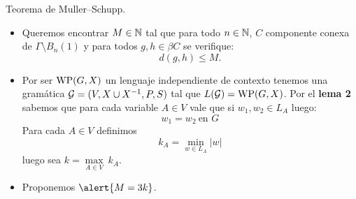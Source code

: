 \documentclass[aspectratio=169, 10pt]{beamer}
\begin{document}
	\begin{frame}[fragile]{Teorema de Muller--Schupp.}
		\begin{itemize}
			\item Queremos encontrar $M \in \mathbb{N}$ tal que para todo $n \in \mathbb{N}$, $C$ componente conexa de $\Gamma \setminus B_{n}(1)$
			y para todos $g,h \in \beta C$ se verifique:
			\[
				d(g,h) \le M.
			\]

			\item Por ser $\text{WP}(G, X)$ un lenguaje independiente de contexto tenemos una gramática ${\cal G} = (V,X \cup X^{-1}, P, S)$ tal que $L({\cal G}) = \text{WP}(G, X)$.
			Por el \textbf{lema 2} sabemos que para cada variable $A \in V$ vale que si $w_{1},w_{2} \in L_{A}$ luego:
			\[
				w_{1} = w_{2} \ \text{en } G
			\]
			Para cada $A \in V$ definimos 
			\[
				k_{A} = \underset{w \in L_{A}}{\min} |w|
			\]
			luego sea $k = \underset{A \in V}{\max} \ k_{A}$.

			\item Proponemos $\alert{M = 3k}$.
		\end{itemize}
	\end{frame}
\end{document}
